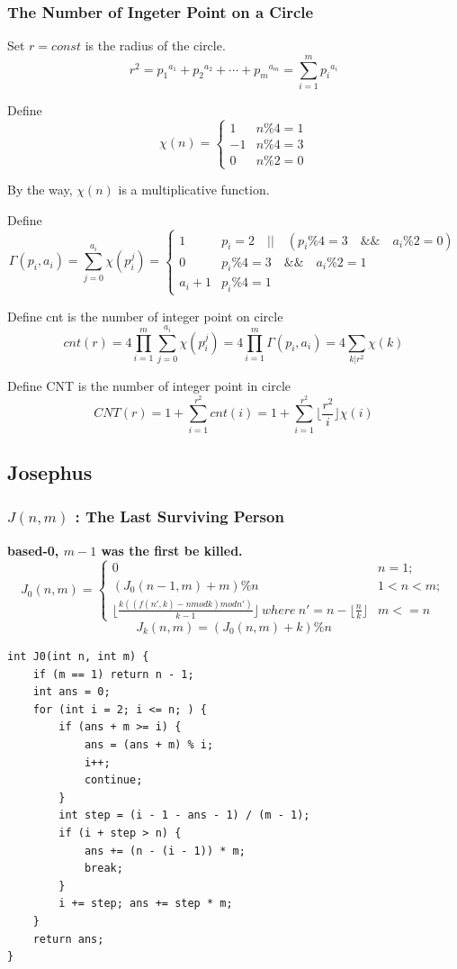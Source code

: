 \documentclass[10pt]{ctexart}
\begin{document}
{{\subsubsection{The Number of Ingeter Point on a Circle}
Set $r = const$ is the radius of the circle.
$$r^2 = {p_1}^{a_1} + {p_2}^{a_2} + \cdots + {p_m}^{a_m} = \sum_{i = 1}^{m} {p_i}^{a_i}$$
\par 
Define
\[
    \chi(n)=
    \begin{cases}
        1 & {n \% 4 = 1} \\
        -1 & {n \% 4 = 3} \\
        0 & {n \% 2 = 0}
    \end{cases}
\]
\par
By the way, $\chi(n)$ is a multiplicative function. 
\par
Define
\[
    \Gamma(p_i,a_i)=\sum_{j = 0}^{a_i}\chi(p_i^j)=
    \begin{cases}
        1 & {p_i = 2 \quad || \quad (p_i \% 4 = 3 \quad \&\& \quad a_i \% 2 = 0)} \\
        0 & {p_i \% 4 = 3 \quad \&\& \quad a_i \% 2 = 1} \\
        a_i + 1 & {p_i \% 4 = 1}
    \end{cases}
\]
\par
Define cnt is the number of integer point on circle
$$cnt(r) = 4 \prod_{i = 1}^{m} \sum_{j = 0}^{a_i} \chi(p_i^j) = 4 \prod_{i = 1}^{m} \Gamma(p_i,a_i) = 4 \sum_{k | r^2}\chi(k)$$
\par
Define CNT is the number of integer point in circle
$$CNT(r) = 1 + \sum_{i = 1}^{r^2}cnt(i) = 1 + \sum_{i = 1}^{r^2} \lfloor \frac{r^2}{i} \rfloor \chi(i)$$
\subsection{Josephus}
\subsubsection{$J(n, m)$ : The Last Surviving Person}
\textbf{based-0, $m - 1$ was the first be killed.}
\[
    J_0(n, m) = 
    \begin{cases}
        0 & n = 1; \\
        (J_0(n - 1, m) + m) \% n & 1 < n < m; \\
        \lfloor \frac{k((f(n', k) - n mod k) mod n')}{k - 1} \rfloor \ where \ n' = n - \lfloor \frac{n}{k} \rfloor & m <= n
    \end{cases}
\]
$$J_k(n, m) = (J_0(n, m) + k) \% n$$
\begin{lstlisting}
int J0(int n, int m) {
    if (m == 1) return n - 1;
    int ans = 0;
    for (int i = 2; i <= n; ) {
        if (ans + m >= i) {
            ans = (ans + m) % i;
            i++;
            continue;
        }
        int step = (i - 1 - ans - 1) / (m - 1);
        if (i + step > n) {
            ans += (n - (i - 1)) * m;
            break;
        }
        i += step; ans += step * m;
    }
    return ans;
}
\end{lstlisting}
}}
\end{document}
